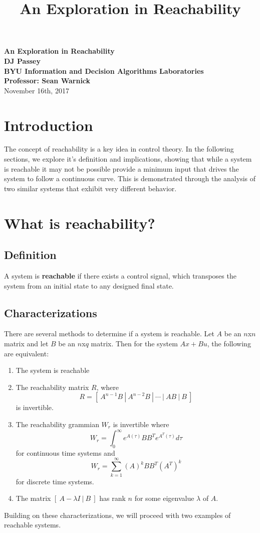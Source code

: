 \documentclass[12pt,letterpaper]{article}
\title{An Exploration in Reachability}
\begin{document}
\renewcommand{\labelitemi}{$\checkmark$}


\begin{center}
	\textbf{\LARGE{An Exploration in Reachability}}\\
	\vspace{7mm}
		\textbf{\large{DJ Passey}}\\

	\vspace{4mm}
	\textbf{\large{BYU Information and Decision Algorithms Laboratories}}\\
	\textbf{\large{Professor: Sean Warnick}}\\
	November 16th, 2017
\end{center}

\vspace{7mm}

\section{Introduction}

The concept of reachability is a key idea in control theory. In the following sections, we explore it's definition and implications, showing that while a system is reachable it may not be possible provide a minimum input that drives the system to follow a continuous curve. This is demonstrated through the analysis of two similar systems that exhibit very different behavior.

\section{What is reachability?}
\subsection{Definition}
A system is \textbf{reachable} if there exists a control signal, which transposes the system from an initial state to any designed final state.
\subsection{Characterizations}
There are several methods to determine if a system is reachable. Let $A$ be an $n$x$n$ matrix and let $B$ be an $n$x$q$ matrix. Then for the system $Ax + Bu$, the following are equivalent:

\begin{enumerate}
\item The system is reachable
\item The reachability matrix $R$, where
\[R = [\ A^{n-1}B\ |\ A^{n-2}B\ |\ \cdots \ |\ AB\ |\ B\ ] \]
is invertible.
\item The reachability grammian $W_{r}$ is invertible where
\[W_{r}=\int _{0}^{\infty} e^{A(\tau)}BB^{T}e^{A^{T}(\tau)}d\tau \]
for continuous time systems and
\[W_{r} = \sum_{k=1}^{\infty} (A)^{k}BB^{T}(A^{T})^{k}\]
for discrete time systems.
\item The matrix $[\ A-\lambda I\ |\ B\ ]$ has rank $n$ for some eigenvalue $\lambda$ of $A$.
\end{enumerate}
 Building on these characterizations, we will proceed with two examples of reachable systems.
\end{document}
